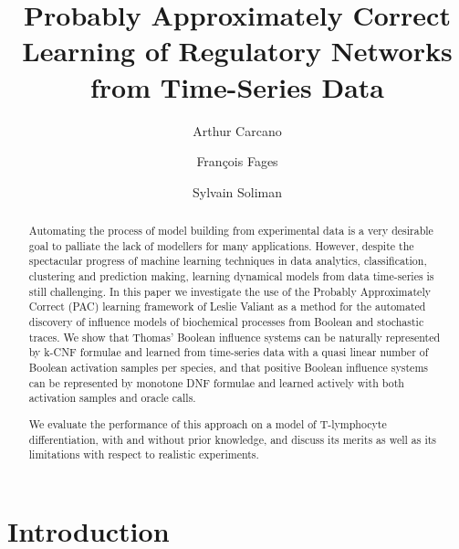 \documentclass{llncs}
\newif\ifcomments%
\newcommand{\francois}[1]{\ifcomments\textcolor{blue}{#1}\fi}
\begin{document}
\title{Probably Approximately Correct Learning of Regulatory Networks from Time-Series Data}

\author{Arthur Carcano \and Fran\c{c}ois Fages \and Sylvain
Soliman}


\maketitle

\begin{abstract}
Automating the process of model building from experimental data 
is a very desirable goal to palliate the lack of modellers for many applications.
However, despite the spectacular progress of machine learning techniques in data analytics, classification, clustering and prediction making,
learning dynamical models from data time-series is still challenging.
In this paper we investigate the use of the Probably Approximately Correct (PAC) learning 
framework of Leslie Valiant as a method for the automated discovery of influence models of biochemical processes from Boolean and stochastic traces. 
We show that Thomas' Boolean influence systems can be naturally represented by k-CNF formulae
and learned
from time-series data with a quasi linear number of Boolean activation samples per species,
and that positive Boolean influence systems can be represented by monotone DNF formulae
and learned actively with both activation samples and oracle calls.
\francois{We consider Boolean abstractions of stochastic simulation traces 
and study the tradeoff there is between the diversity of initial states and the length of the time horizon in terms of the distribution law on transitions
and its impact on the error bounds of PAC learning algorithms.}
We evaluate the performance of this approach on a model of T-lymphocyte
differentiation, with and without prior knowledge,
and discuss its merits as well as its limitations with respect to realistic experiments.
\end{abstract}

\section{Introduction}
\end{document}
